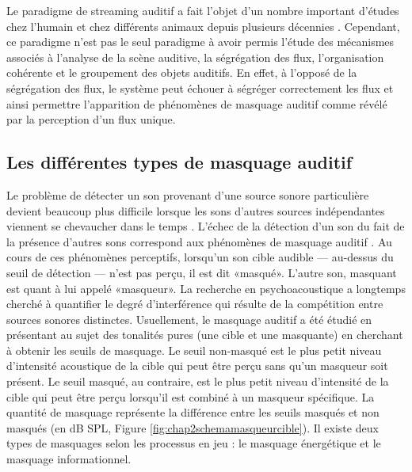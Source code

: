 Le paradigme de streaming auditif a fait l'objet d'un nombre important d'études chez l'humain et chez différents animaux depuis plusieurs décennies \citep{anstis1985adaptation, bee2010neural, carlyon2003cross, dykstra2011widespread, kashino2007dynamics, sussman1999investigation}. 
Cependant, ce paradigme n'est pas le seul paradigme à avoir permis l'étude des mécanismes associés à l'analyse de la scène auditive, la ségrégation des flux, l'organisation cohérente et le groupement des objets auditifs. 
En effet, à l'opposé de la ségrégation des flux, le système peut échouer à ségréger correctement les flux et ainsi permettre l'apparition de phénomènes de masquage auditif comme révélé par la perception d'un flux unique. 

\subsection{Les différentes types de masquage auditif}
\label{masquageauditif}

Le problème de détecter un son provenant d’une source sonore particulière devient beaucoup plus difficile lorsque les sons d’autres sources indépendantes viennent se chevaucher dans le temps \citep{kidd2008informationalreview}. 
L'échec de la détection d'un son du fait de la présence d’autres sons correspond aux phénomènes de masquage auditif \citep{delgutte1990physiological, fletcher1940auditory, moore1995hearing, wegel1924auditory}. 
Au cours de ces phénomènes perceptifs, lorsqu'un son cible audible --- au-dessus du seuil de détection --- n'est pas perçu, il est dit «masqué». 
L'autre son, masquant est quant à lui appelé «masqueur». 
La recherche en psychoacoustique a longtemps cherché à quantifier le degré d’interférence qui résulte de la compétition entre sources sonores distinctes. 
Usuellement, le masquage auditif a été étudié en présentant au sujet des tonalités pures (une cible et une masquante) en cherchant à obtenir les seuils de masquage. 
Le seuil non-masqué est le plus petit niveau d'intensité acoustique de la cible qui peut être perçu sans qu'un masqueur soit présent. 
Le seuil masqué, au contraire, est le plus petit niveau d'intensité de la cible qui peut être perçu lorsqu'il est combiné à un masqueur spécifique. 
La quantité de masquage représente la différence entre les seuils masqués et non masqués (en dB SPL, Figure \ref{fig:chap2schemamasqueurcible}).
Il existe deux types de masquages selon les processus en jeu : le masquage énergétique et le masquage informationnel. 

